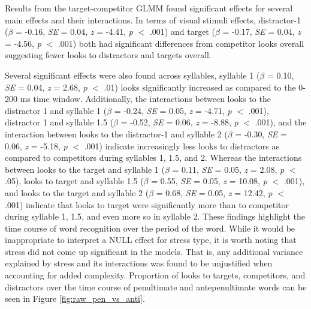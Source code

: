 Results from the target-competitor GLMM found significant effects for several main effects and their interactions. In terms of visual stimuli effects, distractor-1 ($\beta$ = -0.16, \textit{SE} = 0.04, \textit{z} = -4.41, \textit{p} $<$ .001) and target ($\beta$ = -0.17, \textit{SE} = 0.04, \textit{z} = -4.56, \textit{p} $<$ .001) both had significant differences from competitor looks overall suggesting fewer looks to distractors and targets overall. 

Several significant effects were also found across syllables, syllable 1 ($\beta$ = 0.10, \textit{SE} = 0.04, \textit{z} = 2.68, \textit{p} $<$ .01) looks significantly increased as compared to the 0-200 ms time window. Additionally, the interactions between looks to the distractor 1 and syllable 1 ($\beta$ = -0.24, \textit{SE} = 0.05, \textit{z} = -4.71, \textit{p} $<$ .001), distractor 1 and syllable 1.5 ($\beta$ = -0.52, \textit{SE} = 0.06, \textit{z} = -8.88, \textit{p} $<$ .001), and the interaction between looks to the distractor-1 and syllable 2 ($\beta$ = -0.30, \textit{SE} = 0.06, \textit{z} = -5.18, \textit{p} $<$ .001) indicate increasingly less looks to distractors as compared to competitors during syllables 1, 1.5, and 2. Whereas the interactions between looks to the target and syllable 1 ($\beta$ = 0.11, \textit{SE} = 0.05, \textit{z} = 2.08, \textit{p} $<$ .05), looks to target and syllable 1.5 ($\beta$ = 0.55, \textit{SE} = 0.05, \textit{z} = 10.08, \textit{p} $<$ .001), and looks to the target and syllable 2 ($\beta$ = 0.68, \textit{SE} = 0.05, \textit{z} = 12.42, \textit{p} $<$ .001) indicate that looks to target were significantly more than to competitor during syllable 1, 1.5, and even more so in syllable 2. These findings highlight the time course of word recognition over the period of the word. While it would be inappropriate to interpret a NULL effect for stress type, it is worth noting that stress did not come up significant in the models. That is, any additional variance explained by stress and its interactions was found to be unjustified when accounting for added complexity. Proportion of looks to targets, competitors, and distractors over the time course of penultimate and antepenultimate words can be seen in Figure \ref{fig:raw_pen_vs_anti}.

